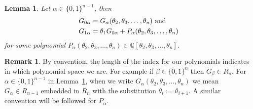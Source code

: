 \documentclass[11pt,oneside]{amsart}
\newtheorem{lemma}[theorem]{Lemma}
\theoremstyle{definition}
\newtheorem{remark}[theorem]{Remark}
\numberwithin{equation}{section}
\begin{document}
\begin{lemma}\label{lem:LT}
 Let $\alpha \in \{0,1\}^{n-1}$, then
\begin{align}
G_{0\alpha} &= G_\alpha(\theta_2, \theta_3, \ldots, \theta_n) \hbox{ and }\label{eq:0start}\\
G_{1\alpha} &= \theta_1 G_{0\alpha} + P_{\alpha}(\theta_2, \theta_3, \ldots, \theta_n) \label{eq:1start}
\end{align}
for some polynomial
$P_{\alpha}(\theta_2, \theta_3, \ldots, \theta_n)
\in {\mathbb Q}[\theta_2, \theta_3, \ldots, \theta_n]$.
\end{lemma}

\begin{remark}\label{rem:shift}
By convention, the length of the index for our polynomials indicates in which polynomial space we are.
For example if $\beta   \in \{0,1\}^{n}$ then $G_\beta\in R_n$. For $\alpha \in \{0,1\}^{n-1}$  in Lemma~\ref{lem:LT}, when we write
$G_\alpha(\theta_2, \theta_3, \ldots, \theta_n)$ we mean $G_\alpha\in  R_{n-1}$
embedded in $R_n$ with the substitution
$\theta_i:=\theta_{i+1}$. A similar convention will be followed for $P_\alpha$.
\end{remark}
\end{document}
